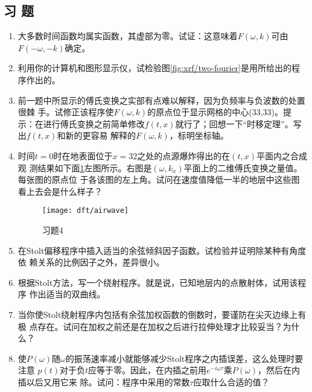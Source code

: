 \subsection{习 题}
\begin{enumerate}
\item 大多数时间函数均属实函数，其虚部为零。试证：这意味着$F(\omega,k)$可由$F(-\omega,-k)$确定。
\item 利用你的计算机和图形显示仪，试检验图\ref{fig:xrf/two-fourier}是用所给出的程序作出的。

\item 前一题中所显示的傅氏变换之实部有点难以解释，因为负频率与负波数的处置很棘
手。试修正该程序使$F(\omega,k)$的原点位于显示网格的中心(33,33)。提示：在进行傅氏变换之前简单修改$f(t,x)$就行了；回想一下“时移定理”。写出$f(t,x)$和新的更容易
解释的$F(\omega,k)$，标明坐标轴。
\item 时间$t=0$时在地表面位于$x=32$之处的点源爆炸得出的在$(t,x)$平面内之合成观
测结果如下面\ref{fig:dft/airwave}左图所示。右图是$(\omega,k_x)$平面上的二维傅氏变换之量值。每张图的原点位
于各该图的左上角。试问在速度值降低一半的地层中这些图看上去会是什么样子？
\begin{figure}[H]
\centering
\texttt{[image: dft/airwave]}
\caption[airwave]{习题4}
\label{fig:dft/airwave}
\end{figure}
\item 在Stolt偏移程序中插入适当的余弦倾斜因子函数。试检验并证明除某种有角度依
赖关系的比例因子之外，差异很小。
\item 根据Stolt方法，写一个绕射程序。就是说，已知地层内的点散射体，试用该程序
作出适当的双曲线。
\item 当你使Stolt绕射程序内包括有余弦加权函数的倒数时，要谨防在尖灭边缘上有极
点存在。试问在加权之前还是在加权之后进行拉伸处理才比较妥当？为什么？
\item 使$P(\omega)$随$\omega$的振荡速率减小就能够减少Stolt程序之内插误差，这么处理时要注意
$p(t)$对于负$t$应等于零。因此，在内插之前用$e^{-i\omega\tau}$乘$P(\omega)$，然后在内插以后又用它来
除。试问：程序中采用的常数$\tau$应取什么合适的值？
\end{enumerate}
